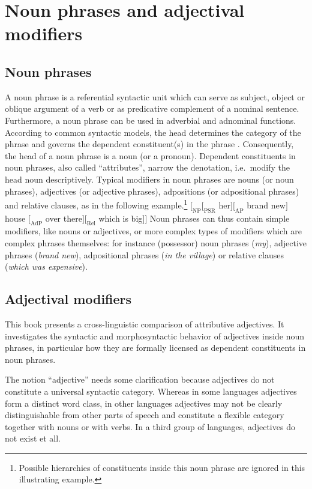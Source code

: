 
\chapter{Noun phrases and adjectival modifiers}

\section{Noun phrases}
A noun phrase is a referential syntactic unit which can serve as subject, object or oblique argument of a verb or as predicative complement of a nominal sentence. Furthermore, a noun phrase can be used in adverbial and adnominal functions. According to common syntactic models, the head determines the category of the phrase and governs the dependent constituent(s) in the phrase \parencite[cf.][57]{nichols1986}. Consequently, the head of a noun phrase is a noun (or a pronoun). Dependent constituents in noun phrases, also called “attributes”, narrow the denotation, i.e.~modify the head noun descriptively. Typical modifiers in noun phrases are nouns (or noun phrases), adjectives (or adjective phrases), adpositions (or adpositional phrases) and relative clauses, as in the following example.\footnote{Possible hierarchies of constituents inside this noun phrase are ignored in this illustrating example.}
\ea 
$[_\textrm{NP} [_\textrm{PSR}$ her$] [_\textrm{AP}$ brand new$]$ house $[_\textrm{AdP}$ over there$] [_\textrm{Rel}$ which is big$] ]$
\z
Noun phrases can thus contain simple modifiers, like nouns or adjectives, or more complex types of modifiers which are complex phrases themselves: for instance (possessor) noun phrases (\textit{my}), adjective phrases (\textit{brand new}), adpositional phrases (\textit{in the village}) or relative clauses (\textit{which was expensive}).

\section{Adjectival modifiers}
This book presents a cross-linguistic comparison of attributive adjectives. It investigates the syntactic and morphosyntactic behavior of adjectives inside noun phrases, in particular how they are formally licensed as dependent constituents in noun phrases.

The notion “adjective” needs some clarification because adjectives do not constitute a universal syntactic category. Whereas in some languages adjectives form a distinct word class, in other languages adjectives may not be clearly distinguishable from other parts of speech and constitute a flexible category together with nouns or with verbs. In a third group of languages, adjectives do not exist et all.

